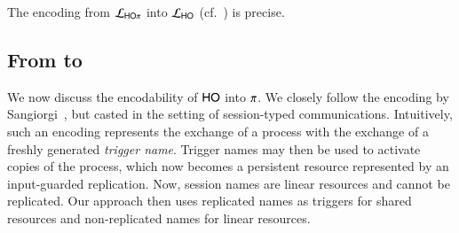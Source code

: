 \begin{theorem}
\label{f:enc:hopitoho}
The encoding from $\mathcal{L}_{\mathsf{HO}\pi}$ into $\mathcal{L}_{\mathsf{HO}}$ (cf.~)
is precise. 
\end{theorem}

\subsection{From \HOp to \sessp}
\label{subsec:HOp_to_sessp}
\noi 
We now discuss the encodability of  $\mathsf{HO}$ into $\pi$. %
We closely follow the encoding  by 
Sangiorgi~\cite{San92,SaWabook}, but casted in the setting of session-typed communications. 
Intuitively, such an encoding  represents the exchange of a process with the exchange of a freshly generated \emph{trigger name}. 
Trigger names may then be used to activate copies of the process, which now becomes a persistent resource represented by an input-guarded replication.
Now, session names are linear resources and cannot be replicated.
Our
approach %
then uses replicated names
as triggers for shared resources and non-replicated names
for linear resources.

